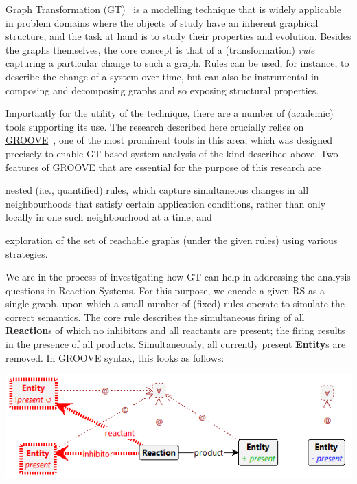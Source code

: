 \documentclass{llncs}
\newcommand{\lab}[1]{\textsf{#1}}
\newcommand{\blab}[1]{\lab{\bfseries #1}}
\begin{document}
Graph Transformation (GT)~\cite{DBLP:series/eatcs/EhrigEPT06,DBLP:books/sp/HeckelT20} is a modelling technique that is widely applicable in problem domains where the objects of study have an inherent graphical structure, and the task at hand is to study their properties and evolution. Besides the graphs themselves, the core concept is that of a (transformation) \emph{rule} capturing a particular change to such a graph. Rules can be used, for instance, to describe the change of a system over time, but can also be instrumental in composing and decomposing graphs and so exposing structural properties.

Importantly for the utility of the technique, there are a number of (academic) tools supporting its use. The research described here crucially relies on \href{https://groove.cs.utwente.nl}{GROOVE}~\cite{DBLP:journals/sttt/GhamarianMRZZ12}, one of the most prominent tools in this area, which was designed precisely to enable GT-based system analysis of the kind described above. Two features of GROOVE that are essential for the purpose of this research are
\begin{enumerate*}[label=\emph{(\roman*)}]
\item nested (i.e., quantified) rules, which capture simultaneous changes in all neighbourhoods that satisfy certain application conditions, rather than only locally in one such neighbourhood at a time; and
\item exploration of the set of reachable graphs (under the given rules) using various strategies.
\end{enumerate*}

We are in the process of investigating how GT can help in addressing the analysis questions in Reaction Systems. For this purpose, we encode a given RS as a single graph, upon which a small number of (fixed) rules operate to simulate the correct semantics. The core rule describes the simultaneous firing of all \blab{Reaction}s of which no \lab{inhibitor}s and all \lab{reactant}s are present; the firing results in the presence of all \lab{product}s. Simultaneously, all currently present \blab{Entity}s are removed. In GROOVE syntax, this looks as follows:

\begin{center}
\includegraphics[scale=.5]{react}
\end{center}
\end{document}
